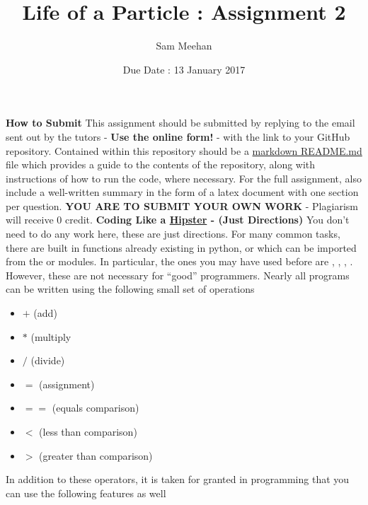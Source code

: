 \documentclass[12pt]{article}
\title{Life of a Particle : Assignment 2}
\author{Sam Meehan}
\date{Due Date : 13 January 2017}
\begin{document}
\maketitle

\textbf{How to Submit}
\newline
This assignment should be submitted by replying to the email sent out by the tutors - \textbf{Use the online form!} - with the link to your GitHub repository.  Contained within this repository should be a \href{https://github.com/adam-p/markdown-here/wiki/Markdown-Cheatsheet}{markdown README.md} file which provides a guide to the contents of the repository, along with instructions of how to run the code, where necessary.  For the full assignment, also include a well-written summary in the form of a latex document with one section per question.
\newline
\newline
\textbf{YOU ARE TO SUBMIT YOUR OWN WORK} - Plagiarism will receive 0 credit.
\newline
\newline
\textbf{Coding Like a \href{https://www.urbandictionary.com/define.php?term=hipster}{Hipster} - (Just Directions)} 
\newline
You don't need to do any work here, these are just directions.  
\newline
\newline
For many common tasks, there are built in functions already existing in python, or which can be imported from the \small{} or \small{} modules.  In particular, the ones you may have used before are \small{}, \small{}, \small{}, \small{}.  However, these are not necessary for ``good'' programmers.  Nearly all programs can be written using the following small set of operations 
\begin{itemize}[noitemsep]
\item $+$ (add)
\item $*$ (multiply
\item $/$ (divide)
\item $=$ (assignment)
\item $==$ (equals comparison)
\item $<$ (less than comparison)
\item $>$ (greater than comparison)
\end{itemize}
In addition to these operators, it is taken for granted in programming that you can use the following features as well
\end{document}
